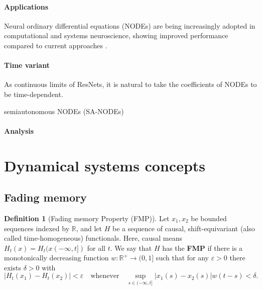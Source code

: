 \documentclass{article}
\theoremstyle{definition}
\newtheorem{definition}{Definition}
\theoremstyle{remark}
\newcounter{ct}
\begin{document}
\paragraph{Applications}
Neural ordinary differential equations (NODEs) are being increasingly adopted in computational and systems neuroscience, showing improved performance compared to current approaches \citep{kim2021inferring,geenjaar2023learning,sedler2023expressive,elgazzar2024universal,rubanova2019latent,coelho2024enhancing}.



\paragraph{Time variant}
As continuous limits of ResNets, it is natural to take the coefficients of NODEs to be time-dependent.

semiautonomous NODEs (SA-NODEs) \citep{li2024universal}


\paragraph{Analysis}
\citep{massaroli2020nodes}




\section{Dynamical systems concepts}
\subsection{Fading memory}
\begin{definition}[Fading memory Property (FMP)]
Let $x_1, x_2$ be bounded sequences indexed by $\mathbb{R}$, and let $H$ be a sequence of causal, shift-equivariant (also called time-homogeneous) functionals.
Here, causal means $H_t(x) = H_t(x(-\infty,t])$ for all $t$.
We say that $H$ has the \textbf{FMP} if there is a monotonically decreasing function $w : \mathbb{R}^+ \to (0, 1]$ such that for any $\varepsilon > 0$ there exists $\delta > 0$ with 
\[
|H_t(x_1) - H_t(x_2)| < \varepsilon \quad \text{whenever} \quad \sup_{s \in (-\infty, t]} |x_1(s) - x_2(s)| w(t - s) < \delta.
\]
\end{definition}
\end{document}

